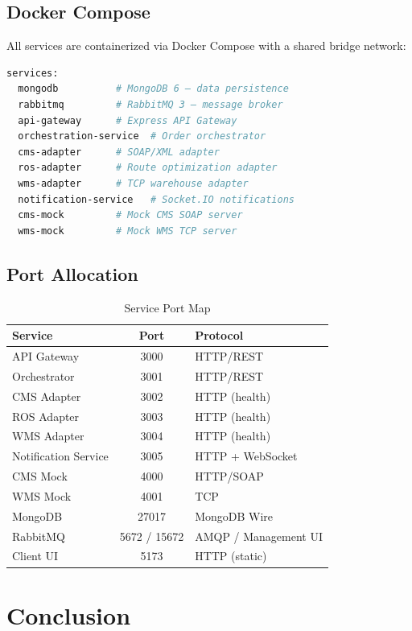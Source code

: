 \documentclass[12pt,a4paper]{article}
\begin{document}
\subsection{Docker Compose}

All services are containerized via Docker Compose with a shared bridge network:

\begin{lstlisting}[language=bash, caption={Docker Compose Service List}]
services:
  mongodb          # MongoDB 6 — data persistence
  rabbitmq         # RabbitMQ 3 — message broker
  api-gateway      # Express API Gateway
  orchestration-service  # Order orchestrator
  cms-adapter      # SOAP/XML adapter
  ros-adapter      # Route optimization adapter
  wms-adapter      # TCP warehouse adapter
  notification-service   # Socket.IO notifications
  cms-mock         # Mock CMS SOAP server
  wms-mock         # Mock WMS TCP server
\end{lstlisting}

\subsection{Port Allocation}

\begin{table}[H]
\centering
\caption{Service Port Map}
\begin{tabular}{lcl}
\toprule
\textbf{Service} & \textbf{Port} & \textbf{Protocol} \\
\midrule
API Gateway & 3000 & HTTP/REST \\
Orchestrator & 3001 & HTTP/REST \\
CMS Adapter & 3002 & HTTP (health) \\
ROS Adapter & 3003 & HTTP (health) \\
WMS Adapter & 3004 & HTTP (health) \\
Notification Service & 3005 & HTTP + WebSocket \\
CMS Mock & 4000 & HTTP/SOAP \\
WMS Mock & 4001 & TCP \\
MongoDB & 27017 & MongoDB Wire \\
RabbitMQ & 5672 / 15672 & AMQP / Management UI \\
Client UI & 5173 & HTTP (static) \\
\bottomrule
\end{tabular}
\end{table}

\section{Conclusion}
\end{document}
